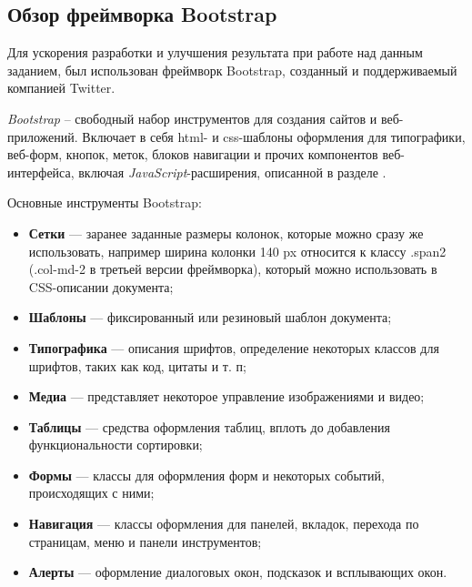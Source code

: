 \subsection{Обзор фреймворка Bootstrap}\label{theory:bootstrap}

Для ускорения разработки и улучшения результата при работе над данным заданием, был использован фреймворк Bootstrap, созданный и поддерживаемый компанией Twitter.

\textit{Bootstrap} -- свободный набор инструментов для создания сайтов и веб-приложений. Включает в себя \gls{html}- и \gls{css}-шаблоны оформления для типографики, веб-форм, кнопок, меток, блоков навигации и прочих компонентов веб-интерфейса, включая \textit{JavaScript}-расширения, описанной в разделе \cite{wiki:bootstrap}. 

Основные инструменты Bootstrap:
\begin{itemize}
	\item \textbf{Сетки} — заранее заданные размеры колонок, которые можно сразу же использовать, например ширина колонки 140 px относится к классу .span2 (.col-md-2 в третьей версии фреймворка), который можно использовать в CSS-описании документа;
	\item \textbf{Шаблоны} — фиксированный или резиновый шаблон документа;
	\item \textbf{Типографика} — описания шрифтов, определение некоторых классов для шрифтов, таких как код, цитаты и т. п;
	\item \textbf{Медиа} — представляет некоторое управление изображениями и видео;
	\item \textbf{Таблицы} — средства оформления таблиц, вплоть до добавления функциональности сортировки;
	\item \textbf{Формы} — классы для оформления форм и некоторых событий, происходящих с ними;
	\item \textbf{Навигация} — классы оформления для панелей, вкладок, перехода по страницам, меню и панели инструментов;
	\item \textbf{Алерты} — оформление диалоговых окон, подсказок и всплывающих окон.
\end{itemize}

